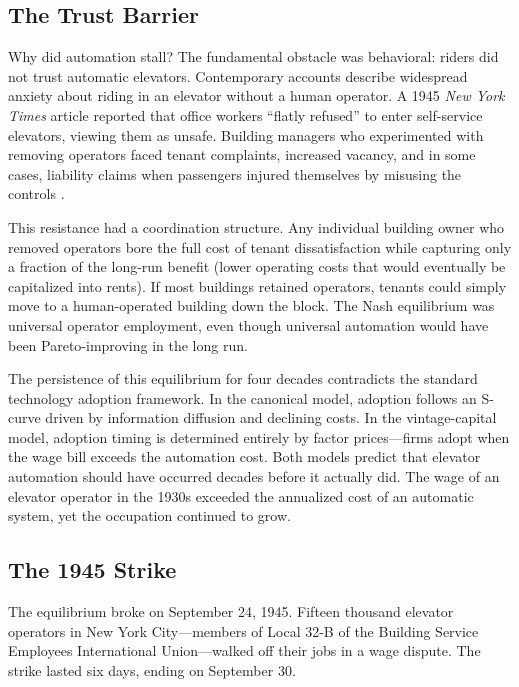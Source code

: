\documentclass[12pt]{article}
\begin{document}
\subsection{The Trust Barrier}

Why did automation stall? The fundamental obstacle was behavioral: riders did not trust automatic elevators. Contemporary accounts describe widespread anxiety about riding in an elevator without a human operator. A 1945 \textit{New York Times} article reported that office workers ``flatly refused'' to enter self-service elevators, viewing them as unsafe. Building managers who experimented with removing operators faced tenant complaints, increased vacancy, and in some cases, liability claims when passengers injured themselves by misusing the controls \citep{gray2013}.

This resistance had a coordination structure. Any individual building owner who removed operators bore the full cost of tenant dissatisfaction while capturing only a fraction of the long-run benefit (lower operating costs that would eventually be capitalized into rents). If most buildings retained operators, tenants could simply move to a human-operated building down the block. The Nash equilibrium was universal operator employment, even though universal automation would have been Pareto-improving in the long run.

The persistence of this equilibrium for four decades contradicts the standard technology adoption framework. In the canonical \citet{griliches1957} model, adoption follows an S-curve driven by information diffusion and declining costs. In the \citet{manuelli2014} vintage-capital model, adoption timing is determined entirely by factor prices---firms adopt when the wage bill exceeds the automation cost. Both models predict that elevator automation should have occurred decades before it actually did. The wage of an elevator operator in the 1930s exceeded the annualized cost of an automatic system, yet the occupation continued to grow.

\subsection{The 1945 Strike}

The equilibrium broke on September 24, 1945. Fifteen thousand elevator operators in New York City---members of Local 32-B of the Building Service Employees International Union---walked off their jobs in a wage dispute. The strike lasted six days, ending on September 30.
\end{document}
